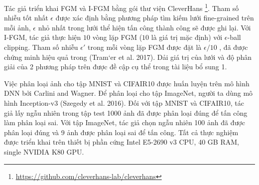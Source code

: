 Tác giả triển khai FGM và I-FGM bằng gói thư viện CleverHans \footnote{\href{https://github.com/cleverhans-lab/cleverhans}{https://github.com/cleverhans-lab/cleverhans}}. Tham số nhiễu tốt nhất $\epsilon$ được xác định bằng phương pháp tìm kiếm lưới fine-grained trên mỗi ảnh, $\epsilon$ nhỏ nhất trong lưới thể hiện tấn công thành công sẽ được ghi lại. Với I-FGM, tác giả thực hiện $10$ vòng lặp FGM ($10$ là giá trị mặc định) với $\epsilon$-ball clipping. Tham số nhiễu $\epsilon'$ trong mỗi vòng lặp FGM được đặt là $\epsilon/10$ , đã được chứng minh hiệu quả trong (Tram`er et al. 2017). Dải giá trị của lưới và độ phân giải của 2 phương pháp trên được đề cập cụ thể trong tài liệu bổ sung 1.

Việc phân loại ảnh cho tập MNIST và CIFAIR10 được huấn luyện trên mô hình DNN bởi Carlini and Wagner. Để phân loại cho tập ImageNet, người ta dùng mô hình Inception-v3 (Szegedy et al. 2016). Đối với tập MNIST và CIFAIR10, tác giả lấy ngẫu nhiên trong tập test 1000 ảnh đã được phân loại đúng để tấn công làm phân loại sai. Với tập ImageNet, tác giả chọn ngẫu nhiên 100 ảnh đã được phân loại đúng và 9 ảnh được phân loại sai để tấn công. Tất cả thực nghiệm được triển khai trên thiết bị phần cứng Intel E5-2690 v3 CPU, 40 GB RAM, single NVIDIA K80 GPU.